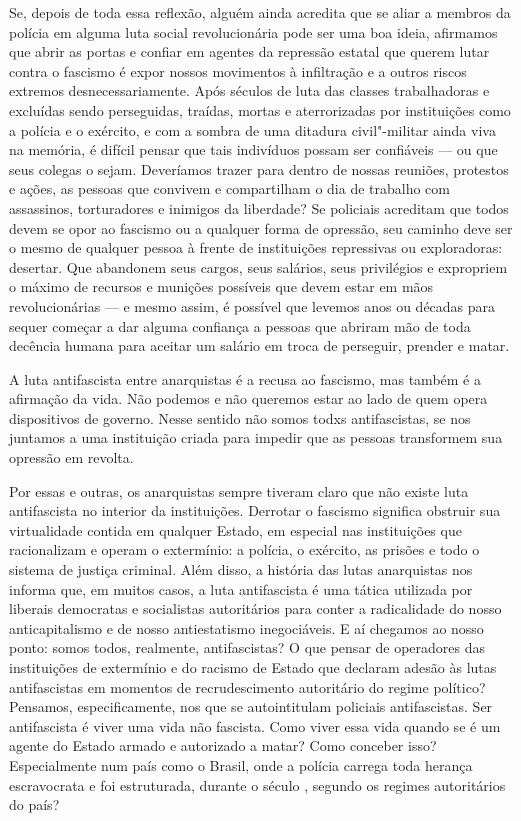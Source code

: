 Se, depois de toda essa reflexão, alguém ainda acredita que se aliar a membros da polícia em alguma luta social revolucionária pode ser uma boa ideia, afirmamos que abrir as portas e confiar em agentes da repressão estatal que querem lutar contra o fascismo é expor nossos movimentos à infiltração e a outros riscos extremos desnecessariamente. Após séculos de luta das classes trabalhadoras e excluídas sendo perseguidas, traídas, mortas e aterrorizadas por instituições como a polícia e o exército, e com a sombra de uma ditadura civil"-militar ainda viva na memória, é difícil pensar que tais indivíduos possam ser confiáveis --- ou que seus colegas o sejam. Deveríamos trazer para dentro de nossas reuniões, protestos e ações, as pessoas que convivem e compartilham o dia de trabalho com assassinos, torturadores e inimigos da liberdade? Se policiais acreditam que todos devem se opor ao fascismo ou a qualquer forma de opressão, seu caminho deve ser o mesmo de qualquer pessoa à frente de instituições repressivas ou exploradoras: desertar. Que abandonem seus cargos, seus salários, seus privilégios e expropriem o máximo de recursos e munições possíveis que devem estar em mãos revolucionárias --- e mesmo assim, é possível que levemos anos ou décadas para sequer começar a dar alguma confiança a pessoas que abriram mão de toda decência humana para aceitar um salário em troca de perseguir, prender e matar.

A luta antifascista entre anarquistas é a recusa ao fascismo, mas também é a afirmação da vida. Não podemos e não queremos estar ao lado de quem opera dispositivos de governo. Nesse sentido não somos todxs antifascistas, se nos juntamos a uma instituição criada para impedir que as pessoas transformem sua opressão em revolta.

Por essas e outras, os anarquistas sempre tiveram claro que não existe luta antifascista no interior da instituições. Derrotar o fascismo significa obstruir sua virtualidade contida em qualquer Estado, em especial nas instituições que racionalizam e operam o extermínio: a polícia, o exército, as prisões e todo o sistema de justiça criminal. Além disso, a história das lutas anarquistas nos informa que, em muitos casos, a luta antifascista é uma tática utilizada por liberais democratas e socialistas autoritários para conter a radicalidade do nosso anticapitalismo e de nosso antiestatismo inegociáveis. E aí chegamos ao nosso ponto: somos todos, realmente, antifascistas? O que pensar de operadores das instituições de extermínio e do racismo de Estado que declaram adesão às lutas antifascistas em momentos de recrudescimento autoritário do regime político? Pensamos, especificamente, nos que se autointitulam policiais antifascistas. Ser antifascista é viver uma vida não fascista. Como viver essa vida quando se é um agente do Estado armado e autorizado a matar? Como conceber isso? Especialmente num país como o Brasil, onde a polícia carrega toda herança escravocrata e foi estruturada, durante o século , segundo os regimes autoritários do país?

